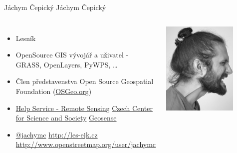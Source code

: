 \documentclass[xcolor=dvipsnames]{beamer}
\begin{document}
\begin{frame}{Jáchym Čepický}
  Jáchym Čepický

  \begin{columns}
    \begin{itemize} 
        \item Lesník
        \item OpenSource GIS vývojář a uživatel - GRASS, OpenLayers, PyWPS, \dots
        \item Člen představenstva Open Source Geospatial Foundation (\href{http://osgeo.org}{OSGeo.org})
        \item \href{http://bnhelp.cz}{Help Service - Remote Sensing}
              \href{http://ccss.cz}{Czech Center for Science and Society}
              \href{http://geosense.cz}{Geosense}
        \item \href{http://twitter.com/jachymc}{@jachymc}
            \href{http://les-ejk.cz}{http://les-ejk.cz}
            \href{http://www.openstreetmap.org/user/jachymc}{http://www.openstreetmap.org/user/jachymc}
    \end{itemize}
    \includegraphics[width=0.75\textwidth]{images/profil2.jpg}
    \end{columns}
\end{frame}
\end{document}
